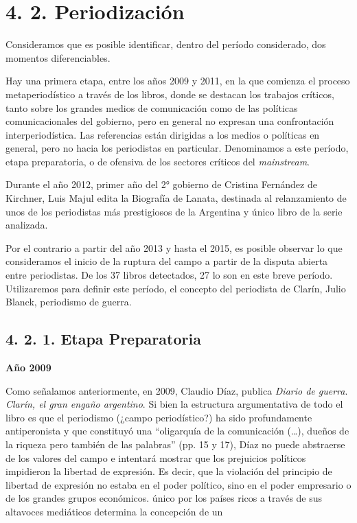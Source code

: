 {\section{4. 2. Periodización}

Consideramos que es posible identificar, dentro del período considerado, dos momentos diferenciables.

Hay una primera etapa, entre los años 2009 y 2011, en la que comienza el proceso metaperiodístico a través de los libros, donde se destacan los trabajos críticos, tanto sobre los grandes medios de comunicación como de las políticas comunicacionales del gobierno, pero en general no expresan una confrontación interperiodística. Las referencias están dirigidas a los medios o políticas en general, pero no hacia los periodistas en particular. Denominamos a este período, etapa preparatoria, o de ofensiva de los sectores críticos del \emph{mainstream}.

Durante el año 2012, primer año del 2° gobierno de Cristina Fernández de Kirchner, Luis Majul edita la Biografía de Lanata, destinada al relanzamiento de unos de los periodistas más prestigiosos de la Argentina y único libro de la serie analizada.

Por el contrario a partir del año 2013 y hasta el 2015, es posible observar lo que consideramos el inicio de la ruptura del campo a partir de la disputa abierta entre periodistas. De los 37 libros detectados, 27 lo son en este breve período. Utilizaremos para definir este período, el concepto del periodista de Clarín, Julio Blanck, periodismo de guerra.

\subsection{4. 2. 1. Etapa Preparatoria}

\textbf{Año 2009}

Como señalamos anteriormente, en 2009, Claudio Díaz, publica \emph{Diario de guerra}. \emph{Clarín, el gran engaño argentino}. Si bien la estructura argumentativa de todo el libro es que el periodismo (¿campo periodístico?) ha sido profundamente antiperonista y que constituyó una \enquote{oligarquía de la comunicación (\ldots), dueños de la riqueza pero también de las palabras} (pp. 15 y 17), Díaz no puede abstraerse de los valores del campo e intentará mostrar que los prejuicios políticos impidieron la libertad de expresión. Es decir, que la violación del principio de libertad de expresión no estaba en el poder político, sino en el poder empresario o de los grandes grupos económicos.
único por los países ricos a través de sus altavoces mediáticos determina la concepción de un

}
